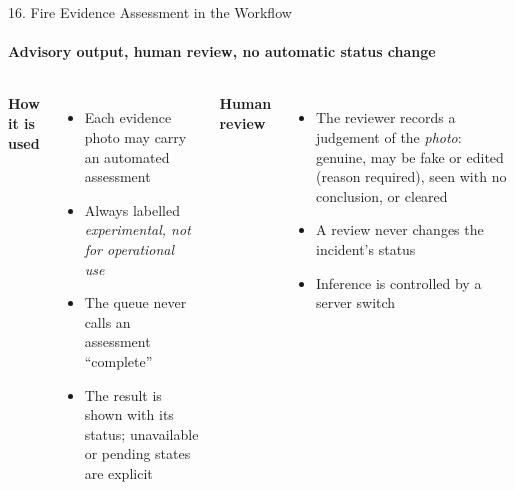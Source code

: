 \begin{frame}{16. Fire Evidence Assessment in the Workflow}
\framesubtitle{Advisory output, human review, no automatic status change}
\scriptsize
\begin{columns}[T,onlytextwidth]
    \textbf{\textcolor{amritaMaroon}{How it is used}}
    \begin{itemize}\setlength\itemsep{2pt}
        \item Each evidence photo may carry an automated assessment
        \item Always labelled \emph{experimental, not for operational use}
        \item The queue never calls an assessment ``complete''
        \item The result is shown with its status; unavailable or pending states are explicit
    \end{itemize}
    \textbf{\textcolor{amritaMaroon}{Human review}}
    \begin{itemize}\setlength\itemsep{2pt}
        \item The reviewer records a judgement of the \emph{photo}: genuine, may be fake or edited (reason required), seen with no conclusion, or cleared
        \item A review never changes the incident's status
        \item Inference is controlled by a server switch
    \end{itemize}
\end{columns}
\vspace{0.2cm}
\begin{center}
\end{center}
\end{frame}

